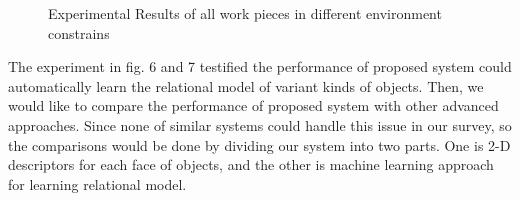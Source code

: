 \documentclass[journal]{IEEEtran}
\begin{document}
\begin{figure}[!t]
\centering


\caption{Experimental Results of all work pieces in different environment constrains}

\end{figure}

The experiment in fig. 6 and 7 testified the performance of proposed system could automatically learn the relational model of variant kinds of objects. Then, we would like to compare the performance of proposed system with other advanced approaches. Since none of similar systems could handle this issue in our survey, so the comparisons would be done by dividing our system into two parts. One is 2-D descriptors for each face of objects, and the other is machine learning approach for learning relational model.
\end{document}
